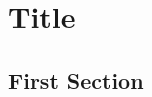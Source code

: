 \chapter{Title } 
\label{chap:Chapter 2}



\blindmathpaper %

\section{First Section}

\blindmathpaper %